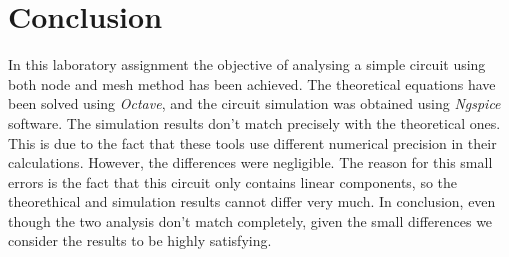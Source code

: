 \section{Conclusion}
\label{sec:conclusion}

In this laboratory assignment the objective of analysing a simple circuit using both node and mesh method has been achieved. The theoretical equations have been solved using \textit{Octave}, and the circuit simulation was obtained using \textit{Ngspice} software. The simulation results don't match precisely with the theoretical ones. This is due to the fact that these tools use different numerical precision in their calculations. However, the differences were negligible. The reason for this small errors is the fact that this circuit only contains linear components, so the theorethical and simulation results cannot differ very much. In conclusion, even though the two analysis don't match completely, given the small differences we consider the results to be highly satisfying.
